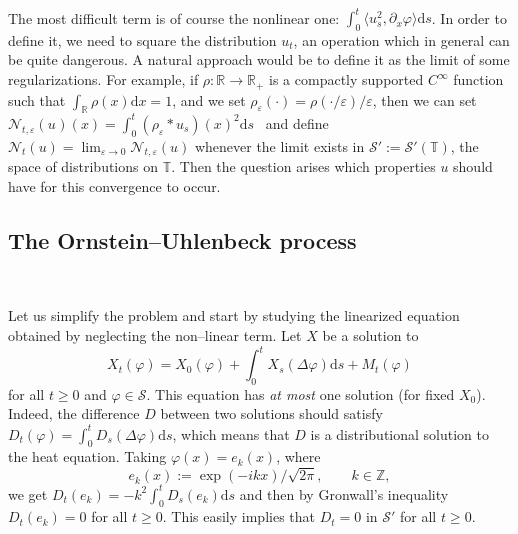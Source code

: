 \documentclass[a4paper,11pt]{article}
\newcommand{\assign}{:=}
\newcommand{\mathd}{\mathrm{d}}
\newcommand{\tmtextit}[1]{{\itshape{#1}}}
\newcommand{\CS}{\mathscr{S}}
\begin{document}
\

The most difficult term is of course the nonlinear one: $\int_0^t \langle
u^2_s, \partial_x \varphi \rangle \mathd s$. In order to define it, we need to
square the distribution $u_t$, an operation which in general can be quite
dangerous. A natural approach would be to define it as the limit of some
regularizations. For example, if $\rho : \mathbb{R} \rightarrow
\mathbb{R}_+$ is a compactly supported $C^{\infty}$ function such that
$\int_{\mathbb{R}} \rho (x) \mathd x = 1$, and we set $\rho_{\varepsilon}
(\cdot) = \rho (\cdot / \varepsilon) / \varepsilon$, then we can set
$\mathcal{N}_{t, \varepsilon} (u_{}) (x) = \int_0^t (\rho_{\varepsilon} \ast
u_s) (x)^2 \mathd s$ \ and define $\mathcal{N}_t (u) = \lim_{\varepsilon
\rightarrow 0} \mathcal{N}_{t, \varepsilon} (u)$ whenever the limit exists in
$\CS' \assign \CS' (\mathbb{T})$, the space of distributions on
$\mathbb{T}$. Then the question arises which properties $u$ should have for
this convergence to occur.

\subsection{The Ornstein--Uhlenbeck process}

\

Let us simplify the problem and start by studying the linearized equation
obtained by neglecting the non--linear term. Let $X$ be a solution to
\begin{equation}
  X_t (\varphi) = X_0 (\varphi) + \int_0^t X_s (\Delta \varphi) \mathd s + M_t
  (\varphi) \label{eq:ou-weak}
\end{equation}
for all $t \geqslant 0$ and $\varphi \in \CS$. This equation has \tmtextit{at
most} one solution (for fixed $X_0$). Indeed, the difference $D$ between two
solutions should satisfy $D_t (\varphi) = \int_0^t D_s (\Delta \varphi) \mathd
s$, which means that $D$ is a distributional solution to the heat equation.
Taking $\varphi (x) = e_k (x)$, where
\[ e_k (x) \assign \exp (- i kx) / \sqrt{2 \pi}, \hspace{2em} k \in
   \mathbb{Z}, \]
we get $D_t (e_k) = - k^2 \int_0^t D_s (e_k) \mathd s$ and then by Gronwall's
inequality $D_t (e_k) = 0$ for all $t \geqslant 0$. This easily implies that
$D_t = 0$ in $\CS'$ for all $t \geqslant 0$.
\end{document}
